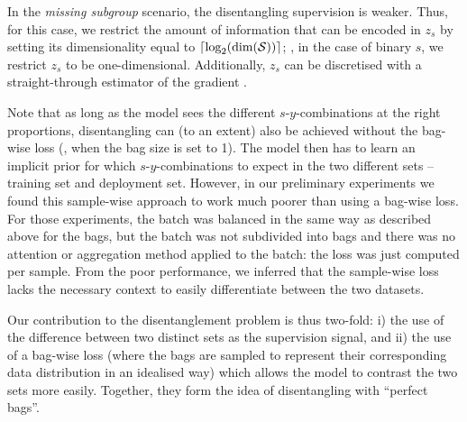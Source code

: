 %
In the \emph{missing subgroup} scenario, the disentangling supervision is weaker.
Thus, for this case, we restrict the amount of information that can be encoded in $z_s$ by setting its dimensionality equal to $\lceil \text{log}_2(\text{dim}(\mathcal{S})) \rceil$;
\eg, in the case of binary $s$, we restrict $z_s$ to be one-dimensional.
Additionally, $z_s$ can be discretised with a straight-through estimator of the gradient \citep{bengio2013estimating}.

Note that as long as the model sees the different \(s\)-\(y\)-combinations at the right proportions,
disentangling can (to an extent) also be achieved without the bag-wise loss
(\ie, when the bag size is set to 1).
The model then has to learn an implicit prior for which \(s\)-\(y\)-combinations to expect
in the two different sets -- training set and deployment set.
However, in our preliminary experiments we found this sample-wise approach to work much poorer
than using a bag-wise loss.
For those experiments, the batch was balanced in the same way as described above for the bags,
but the batch was not subdivided into bags
and there was no attention or aggregation method applied to the batch:
the loss was just computed per sample.
From the poor performance,
we inferred that the sample-wise loss lacks the necessary context
to easily differentiate between the two datasets.

Our contribution to the disentanglement problem is thus two-fold:
i) the use of the difference between two distinct sets as the supervision signal,
and ii) the use of a bag-wise loss
(where the bags are sampled to represent their corresponding data distribution in an idealised way)
which allows the model to contrast the two sets more easily.
Together, they form the idea of disentangling with ``perfect bags''.


